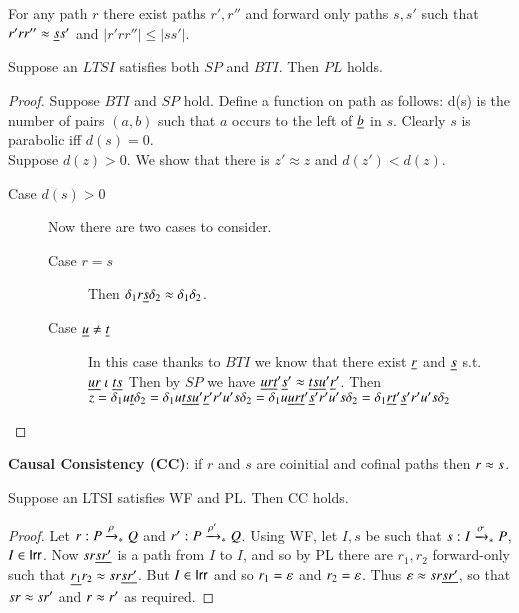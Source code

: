 








\begin{definition}
  For any path $r$ there exist paths $r',r''$ and forward only paths $s,s'$ such
  that $r'rr'' \approx \underline{s}s'$ and $|r'rr''| \leq |ss'|$.
\end{definition}

\begin{proposition}
  Suppose an $LTSI$ satisfies both $SP$ and $BTI$. Then $PL$ holds.
\end{proposition}
\begin{proof}
  Suppose $BTI$ and $SP$ hold. Define a function on path as follows: d(s) is the
  number of pairs $(a,b)$ such that $a$ occurs to the left of $\underline{b}$ in $s$.
  Clearly $s$ is parabolic iff $d(s)=0$. \\

  Suppose $d(z)>0$. We show that there is $z' \approx z$ and $d(z') < d(z)$.
  \begin{description}
  \item[Case $d(s)>0$] Now there are two cases to consider.
    \begin{description}
    \item[Case $r = s$] Then $\delta_1 r\underline{s}\delta_2 \approx
      \delta_1\delta_2$.
    \item[Case $\underline{u} \neq \underline{t}$] In this case thanks to $BTI$ we know that
      there exist $\underline{r}$ and $\underline{s}$ s.t. $\underline{u} \underline{r} \mathrel{\iota} \underline{t} \underline{s}$ Then
      by $SP$ we have $\underline{u} \underline{r} \underline{t}' \underline{s}'
      \approx \underline{t} \underline{s} \underline{u}' \underline{r}'$. Then $z=\delta_1 u \underline{t}
      \delta_2 = \delta_1 u \underline{t} \underline{s} \underline{u}' \underline{r}' r' u' s \delta_2 =
      \delta_1 u  \underline{u} \underline{r} \underline{t}' \underline{s}' r' u' s \delta_2 = \delta_1 \underline{r} \underline{t}' \underline{s}' r' u' s \delta_2$ 
      
    \end{description}
  \end{description}
  
\end{proof}

\begin{definition}\label{def:cc}
  {\bf Causal Consistency (CC)}: if $r$ and $s$ are coinitial and cofinal paths then $r \approx s$.
\end{definition}

\begin{proposition}\label{prop:PL WF CC}
  Suppose an LTSI satisfies WF and PL. 
  Then CC holds.
\end{proposition}
\begin{proof}
  Let $r:P \xrightarrow[]{\rho}_{*} Q$ and $r':P \xrightarrow[]{\rho'}_{*} Q$.
  Using WF, let $I,s$ be such that $s:I \xrightarrow[]{\sigma}_{*} P$, $I \in \mathsf{Irr}$.
  Now $sr\underline{sr'}$ is a path from $I$ to $I$,
  and so by PL there are $r_1,r_2$ forward-only such that $\underline{r_1}r_2 \approx sr\underline{sr'}$.
  But $I \in \mathsf{Irr}$ and so $r_1 = \varepsilon$ and $r_2 = \varepsilon$.
  Thus $\varepsilon \approx sr\underline{sr'}$, so that $sr \approx sr'$ and $r \approx r'$
  as required.
\end{proof}